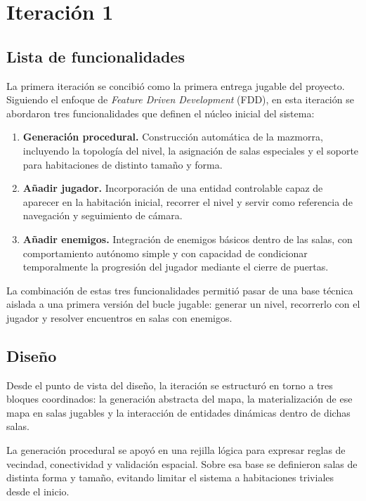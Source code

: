 \chapter{Iteración 1}

\section{Lista de funcionalidades}
La primera iteración se concibió como la primera entrega jugable del proyecto. Siguiendo
el enfoque de \textit{Feature Driven Development} (FDD), en esta iteración se abordaron
tres funcionalidades que definen el núcleo inicial del sistema:

\begin{enumerate}
\item \textbf{Generación procedural.} Construcción automática de la mazmorra, incluyendo
la topología del nivel, la asignación de salas especiales y el soporte para habitaciones
de distinto tamaño y forma.
\item \textbf{Añadir jugador.} Incorporación de una entidad controlable capaz de aparecer
en la habitación inicial, recorrer el nivel y servir como referencia de navegación y
seguimiento de cámara.
\item \textbf{Añadir enemigos.} Integración de enemigos básicos dentro de las salas, con
comportamiento autónomo simple y con capacidad de condicionar temporalmente la progresión
del jugador mediante el cierre de puertas.
\end{enumerate}

La combinación de estas tres funcionalidades permitió pasar de una base técnica aislada a
una primera versión del bucle jugable: generar un nivel, recorrerlo con el jugador y
resolver encuentros en salas con enemigos.

\section{Diseño}
Desde el punto de vista del diseño, la iteración se estructuró en torno a tres bloques
coordinados: la generación abstracta del mapa, la materialización de ese mapa en salas
jugables y la interacción de entidades dinámicas dentro de dichas salas.

La generación procedural se apoyó en una rejilla lógica para expresar reglas de vecindad,
conectividad y validación espacial. Sobre esa base se definieron salas de distinta forma y
tamaño, evitando limitar el sistema a habitaciones triviales desde el inicio.

